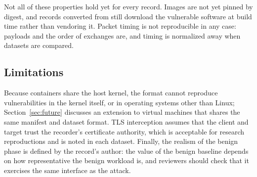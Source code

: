 Not all of these properties hold yet for every record. Images are not yet
pinned by digest, and records converted from \genie still download the
vulnerable software at build time rather than vendoring it. Packet timing is
not reproducible in any case: payloads and the order of exchanges are, and
timing is normalized away when datasets are compared.

\subsection{Limitations}

Because containers share the host kernel, the format cannot reproduce
vulnerabilities in the kernel itself, or in operating systems other than
Linux; Section~\ref{sec:future} discusses an extension to virtual machines
that shares the same manifest and dataset format. TLS interception assumes
that the client and target trust the recorder's certificate authority, which
is acceptable for research reproductions and is noted in each dataset.
Finally, the realism of the benign phase is defined by the record's author:
the value of the benign baseline depends on how representative the benign
workload is, and reviewers should check that it exercises the same interface
as the attack.
